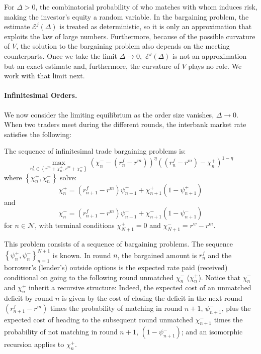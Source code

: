 \documentclass[12pt,american,english,notitlepage]{article}
\begin{document}
For $\Delta>0$, the combinatorial probability of who matches with whom induces risk, making the investor's equity a random variable.
In the bargaining problem, the estimate $\mathcal{E}^{j}\left(\Delta\right)$
is treated as deterministic, so it is only an approximation that exploits
the law of large numbers. Furthermore, because of the possible curvature
of $V$, the solution to the bargaining problem also depends on the
meeting counterparts. Once we take the limit $\Delta\rightarrow0,$
$\mathcal{E}^{j}\left(\Delta\right)$ is not an approximation but
an exact estimate and, furthermore, the curvature of $V$ plays no
role. We work with that limit next.

\paragraph*{Infinitesimal Orders.}

We now consider the limiting equilibrium as the order size vanishes,
$\Delta\rightarrow0.$ When two traders meet during the different rounds, the interbank market rate satisfies the following:
\begin{problem} \label{prob:limit}
The sequence of infinitesimal trade bargaining problems is:
\[
\max_{r_{n}^{f}\in\left\{ r^{m}+\chi_{n}^{+},r^{m}+\chi_{n}^{-}\right\} }\left(\chi_{n}^{-}-\left(r_{n}^{f}-r^{m}\right)\right)^{\eta}\left(\left(r_{n}^{f}-r^{m}\right)-\chi_{n}^{+}\right)^{1-\eta}
\]
where $\left\{ \chi_{n}^{+},\chi_{n}^{-}\right\} $ solve:
\begin{equation}
\chi_{n}^{+}=\left(r_{n+1}^{f}-r^{m}\right)\psi_{n+1}^{+}+\chi_{n+1}^{+}\left(1-\psi_{n+1}^{+}\right)\label{eq:xi_p_lom}
\end{equation}
and
\begin{equation}
\chi_{n}^{-}=\left(r_{n+1}^{f}-r^{m}\right)\psi_{n+1}^{-}+\chi_{n+1}^{-}\left(1-\psi_{n+1}^{-}\right)\label{eq:xi_m_lom}
\end{equation}
for $n\in\mathcal{N}$, with terminal conditions $\chi_{N+1}^{+}=0$
and $\chi_{N+1}^{-}=r^{w}-r^{m}$.

\end{problem}

This problem consists of a sequence of bargaining problems. The sequence
$\left\{ \psi_{n}^{+},\psi_{n}^{-}\right\} _{n=1}^{N+1}$ is known.
In round $n$, the bargained amount is $r_{n}^{f}$ and the borrower's
(lender's) outside options is the expected rate paid (received) conditional
on going to the following round unmatched $\chi_{n}^{-}$ ($\chi_{n}^{+}$).
Notice that $\chi_{n}^{-}$ and $\chi_{n}^{+}$ inherit a recursive
structure: Indeed, the expected cost of an unmatched deficit by round
$n$ is given by the cost of closing the deficit in the next round
$\left(r_{n+1}^{f}-r^{m}\right)$ times the probability of matching
in round $n+1$, $\psi_{n+1}^{-}$, plus the expected cost of heading
to the subsequent round unmatched $\chi_{n+1}^{-}$ times the probability
of not matching in round $n+1$, $\left(1-\psi_{n+1}^{-}\right)$;
and an isomorphic recursion applies to $\chi_{n}^{+}$.
\end{document}
